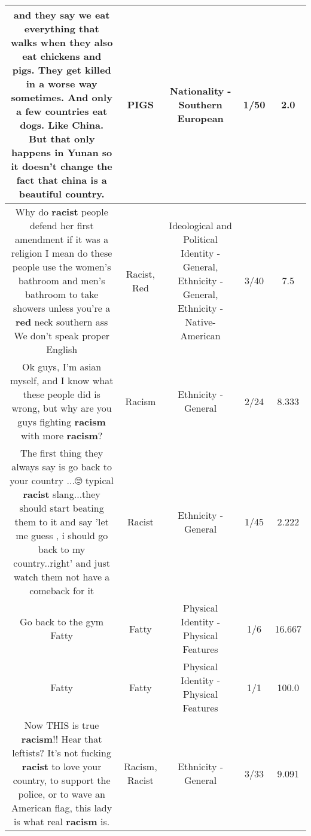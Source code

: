 \documentclass[11pt]{article}
\newlength\mylength
\begin{document}
\begin{center}
\begin{longtable}{|C{.65\mylength}|C{.30\mylength}|C{.12\mylength}|C{.12\mylength}|C{.12\mylength}|}
  \small and they say we eat everything that walks when they also eat chickens and \textbf{pigs}. They get killed in a worse way sometimes. And only a few countries eat dogs. Like China. But that only happens in Yunan so it doesn't change the fact that china is a beautiful country.\normalsize   & PIGS & Nationality - Southern European & 1/50 & 2.0 \\  \hline
  \small Why do \textbf{racist} people defend her first amendment if it was a religion I mean do these people use the women's bathroom and men's bathroom to take showers unless you're a \textbf{r\textbf{ed}} neck southern ass We don't speak proper English\normalsize   & Racist, Red &  Ideological and Political Identity - General, Ethnicity - General, Ethnicity - Native-American & 3/40 & 7.5 \\  \hline
  \small Ok guys, I'm asian myself, and I know what these people did is wrong, but why are you guys fighting \textbf{racism} with more \textbf{racism}?\normalsize   & Racism & Ethnicity - General & 2/24 & 8.333 \\  \hline
  \small The first thing they always say is go back to your country ...🙄 typical \textbf{racist} slang...they should start beating them to it and say 'let me guess , i should go back to my country..right' and just watch them not have a comeback for it\normalsize   & Racist & Ethnicity - General & 1/45 & 2.222 \\  \hline
  \small Go back to the gym Fatty\normalsize   & Fatty & Physical Identity - Physical Features & 1/6 & 16.667 \\  \hline
  \small Fatty\normalsize   & Fatty & Physical Identity - Physical Features & 1/1 & 100.0 \\  \hline
  \small Now THIS is true \textbf{racism}!! Hear that leftists? It's not fucking \textbf{racist} to love your country, to support the police, or to wave an American flag, this lady is what real \textbf{racism} is.\normalsize   & Racism, Racist & Ethnicity - General & 3/33 & 9.091 \\  \hline

\end{longtable}
\end{center}
\end{document}
